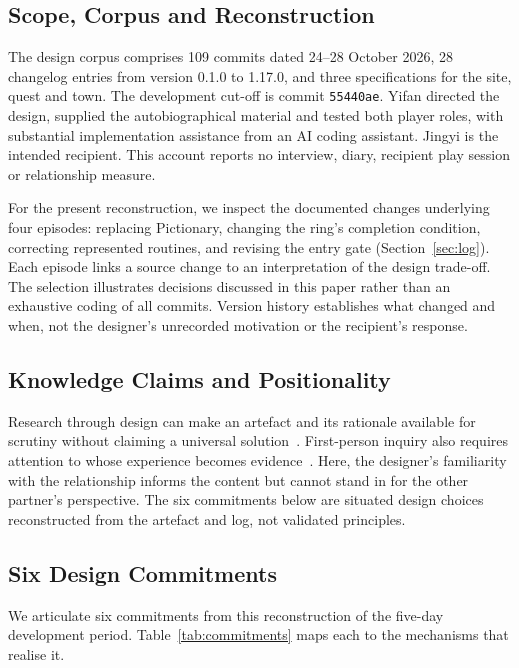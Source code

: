 \documentclass[sigconf,nonacm]{acmart}
\newcommand{\code}[1]{\textnormal{\texttt{\small #1}}}
\begin{document}
\subsection{Scope, Corpus and Reconstruction}
The design corpus comprises 109 commits dated 24--28 October 2026, 28 changelog entries from
version 0.1.0 to 1.17.0, and three specifications for the site, quest and town. The development
cut-off is commit \code{55440ae}.
Yifan directed the design, supplied the autobiographical material and tested both player roles,
with substantial implementation assistance from an AI coding assistant. Jingyi is the intended
recipient. This account reports no interview, diary, recipient play session or relationship measure.

For the present reconstruction, we inspect the documented changes underlying four episodes:
replacing Pictionary, changing the ring's completion condition, correcting represented routines,
and revising the entry gate (Section~\ref{sec:log}). Each episode links a source change to an
interpretation of the design trade-off. The selection illustrates decisions discussed in this
paper rather than an exhaustive coding of all commits. Version history establishes what changed
and when, not the designer's unrecorded motivation or the recipient's response.

\subsection{Knowledge Claims and Positionality}
Research through design can make an artefact and its rationale available for scrutiny without
claiming a universal solution~\cite{zimmerman2007rtd,gaver2012expect}. First-person inquiry also
requires attention to whose experience becomes evidence~\cite{desjardins2018tensions,desjardins2021firstperson}.
Here, the designer's familiarity with the relationship informs the content but cannot stand in
for the other partner's perspective. The six commitments below are situated design choices
reconstructed from the artefact and log, not validated principles.

\subsection{Six Design Commitments}
We articulate six commitments from this reconstruction of the five-day development period. Table~\ref{tab:commitments} maps each to
the mechanisms that realise it.
\end{document}
